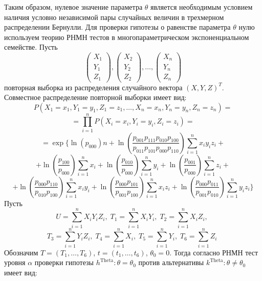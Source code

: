     Таким образом, нулевое значение параметра
    $\theta$ является необходимым условием наличия условно независимой пары
    случайных величин в трехмерном распределении Бернулли.
    Для проверки гипотезы о равенстве параметра $\theta$ нулю используем 
    теорию РНМН тестов \cite{Lehmann1986} в многопараметрическом 
    экспоненциальном семействе. Пусть
    $$
        \begin{pmatrix}
            X_1 \\
            Y_1 \\
            Z_1
        \end{pmatrix},
        \begin{pmatrix}
            X_2 \\
            Y_2 \\
            Z_2
        \end{pmatrix}, \ldots,
        \begin{pmatrix}
            X_n \\
            Y_n \\
            Z_n
        \end{pmatrix}
    $$ повторная выборка из распределения случайного вектора $(X,Y,Z)^T$.
    Совместное распределение повторной выборки имеет вид:
    $$
    P(X_1=x_1,Y_1=y_1,Z_1=z_1,\ldots,X_n=x_n,Y_n=y_n,Z_n=z_n)=
    $$
    $$
    =\prod_{i=1}^n P(X_i=x_i,Y_i=y_i,Z_i=z_i) =
    $$
    $$
     =\exp \Biggl\{\ln(p_{000})n + \ln  \left(\dfrac{p_{001}p_{111}p_{010}p_{100}}{p_{011}p_{101}p_{000}p_{110}}\right) \sum_{i=1}^n x_i y_i z_i +$$
        $$ +
            \ln\left(\dfrac{p_{100}}{p_{000}}\right) \sum_{i=1}^{n} x_i + \ln\left(\dfrac{p_{010}}{p_{000}}\right) \sum_{i=1}^{n} y_i +
            \ln\left(\dfrac{p_{001}}{p_{000}}\right) \sum_{i=1}^{n} z_i +
        $$
        $$
            +\ln \left(\dfrac{p_{000}p_{110}}{p_{010}p_{100}}\right) \sum_{i=1}^n x_i y_i +
            \ln \left(\dfrac{p_{000}p_{101}}{p_{001}p_{100}}\right) \sum_{i=1}^n x_i z_i +
            \ln \left(\dfrac{p_{000}p_{011}}{p_{001}p_{010}}\right) \sum_{i=1}^n y_i z_i \Biggr\}
        $$
    Пусть 
    $$
        U = \sum_{i=1}^n X_i Y_i Z_i, \;
        T_1 = \sum_{i=1}^n X_i Y_i, \;
        T_2 = \sum_{i=1}^n X_i Z_i, \;
    $$
    $$
        T_3 = \sum_{i=1}^n Y_i Z_i, \;
        T_4 = \sum_{i=1}^n X_i, \;
        T_5 = \sum_{i=1}^n Y_i, \;
        T_6 = \sum_{i=1}^n Z_i \;
    $$
    Обозначим $T=(T_1,\ldots,T_6)$, $t=(t_1,\ldots,t_6)$, $\theta_0=0$.
    Тогда согласно \cite{Lehmann1986} РНМН тест уровня $\alpha$ проверки гипотезы $h^{\text{Theta}}:\theta=\theta_0$ против альтернативы $k^{\text{Theta}}:\theta \neq \theta_0$ имеет вид:
